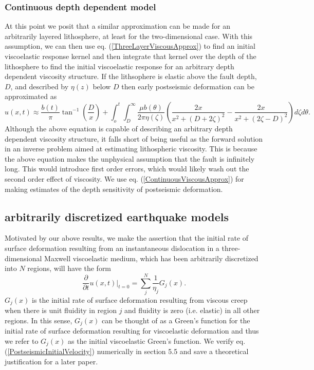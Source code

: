 \documentclass[extra]{gji}
\begin{document}
\subsubsection{Continuous depth dependent model}
At this point we posit that a similar approximation can be made for an
arbitrarily layered lithosphere, at least for the two-dimensional
case.  With this assumption, we can then use
eq. (\ref{ThreeLayerViscousApprox}) to find an initial viscoelastic
response kernel and then integrate that kernel over the depth of the
lithosphere to find the initial viscoelastic response for an arbitrary
depth dependent viscosity structure.  If the lithsophere is elastic
above the fault depth, $D$, and described by $\eta(z)$ below $D$ then
early postseismic deformation can be approximated as
\begin{equation}\label{ContinuousViscousApprox}
u(x,t) \approx \frac{b(t)}{\pi}\tan^{-1}(\frac{D}{x}) + 
               \int_o^t\int_D^\infty \frac{\mu b(\theta)}{2\pi\eta(\zeta)}
                                    \left(\frac{2x}{x^2 + \left(D + 2\zeta\right)^2} - 
                                    \frac{2x}{x^2 + \left(2\zeta - D\right)^2}\right)
                                    d\zeta d\theta.
\end{equation}
Although the above equation is capable of describing an arbitrary
depth dependent viscosity structure, it falls short of being useful as
the forward solution in an inverse problem aimed at estimating
lithospheric viscosity.  This is because the above equation makes the
unphysical assumption that the fault is infinitely long.  This would
introduce first order errors, which would likely wash out the second
order effect of viscosity. We use eq. (\ref{ContinuousViscousApprox})
for making estimates of the depth sensitivity of postseismic
deformation.

\subsection{arbitrarily discretized earthquake models}
Motivated by our above results, we make the assertion that the initial
rate of surface deformation resulting from an instantaneous
dislocation in a three-dimensional Maxwell viscoelastic
medium, which has been arbitrarily discretized into $N$ regions, will
have the form
\begin{equation}\label{PostseismicInitialVelocity}
  \frac{\partial}{\partial t}u(x,t)\big|_{t=0} = \sum_j^N\frac{1}{\eta_j}G_j(x).
\end{equation}
$G_j(x)$ is the initial rate of surface deformation resulting from
viscous creep when there is unit fluidity in region $j$ and fluidity
is zero (i.e. elastic) in all other regions.  In this sense, $G_j(x)$
can be thought of as a Green's function for the initial rate of
surface deformation resulting for viscoelastic deformation and thus we
refer to $G_j(x)$ as the initial viscoelastic Green's function.  We
verify eq. (\ref{PostseismicInitialVelocity}) numerically in section 5.5
and save a theoretical justification for a later paper.
\end{document}
